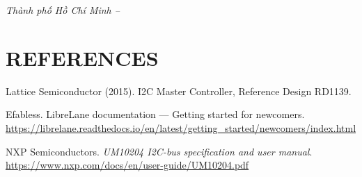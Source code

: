 \documentclass[12pt,a4paper]{article}
\begin{document}
\begin{titlepage}
    \vfill

    {\fontsize{13}{16}\selectfont \textit{Thành phố Hồ Chí Minh -- \the\year}}

    \vspace{0.5cm}

    \restoregeometry
\end{titlepage}

\newpage
\tableofcontents

\newpage
\listoffigures
{}

\newpage
\listoftables
{}

\newpage


\clearpage


\clearpage


\clearpage


\clearpage


\clearpage


\clearpage


\newpage
\section*{REFERENCES}

\noindent Lattice Semiconductor (2015). I2C Master Controller, Reference Design RD1139.

\noindent Efabless. LibreLane documentation --- Getting started for newcomers. \url{https://librelane.readthedocs.io/en/latest/getting_started/newcomers/index.html}

\noindent NXP Semiconductors. \emph{UM10204 I2C-bus specification and user manual}. \url{https://www.nxp.com/docs/en/user-guide/UM10204.pdf}
\end{document}
